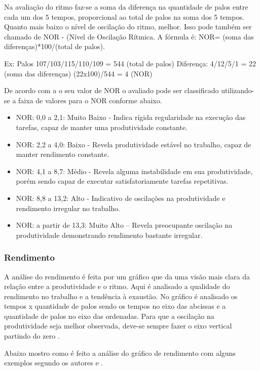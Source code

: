 Na avaliação do ritmo faz-se a soma da diferença na quantidade de palos entre cada um dos 5 tempos, proporcional ao total de palos na soma dos 5 tempos. Quanto mais baixo o nível de oscilação do ritmo, melhor. Isso pode também ser chamado de NOR - (Nível de Oscilação Rítmica. A fórmula é: NOR= (soma das diferenças)*100/(total de palos).\cite{marcosjaime2013} 

Ex: Palos 107/103/115/110/109 = 544 (total de palos)
Diferença: 4/12/5/1 = 22 (soma das diferenças)
(22x100)/544 = 4 (NOR)

De acordo com a o seu valor de NOR o avaliado pode ser classificado utilizando-se a faixa de valores para o NOR conforme abaixo. \cite{marcosjaime2013}

\begin{itemize}
\item NOR: 0,0 a 2,1: Muito Baixo - Indica rígida regularidade na execução das tarefas, capaz de manter uma produtividade constante.
\item NOR: 2,2 a 4,0: Baixo - Revela produtividade estável no trabalho, capaz de manter rendimento constante.
\item NOR: 4,1 a 8,7: Médio - Revela alguma instabilidade em sua produtividade, porém sendo capaz de executar satisfatoriamente tarefas repetitivas.
\item NOR: 8,8 a 13,2: Alto - Indicativo de oscilações na produtividade e rendimento irregular no trabalho.
\item NOR: a partir de 13,3: Muito Alto – Revela preocupante oscilação na produtividade demonstrando rendimento bastante irregular.
\end{itemize}

\subsubsection{Rendimento}
\label{subsub:rend}

A análise do rendimento é feita por um gráfico que da uma visão mais clara da relação entre a produtividade e o ritmo. Aqui é analisado a qualidade do rendimento no trabalho e a tendência à exaustão. No gráfico é analisado os tempos x quantidade de palos sendo os tempos no eixo das abcissas e a quantidade de palos no eixo das ordenadas. Para que a oscilação na produtividade seja melhor observada, deve-se sempre fazer o eixo vertical partindo do zero \cite{psicohood2018}.

Abaixo mostro como é feito a análise do gráfico de rendimento com alguns exemplos segundo os autores \cite{psicohood2018} e \cite{manualPsico2010}.

